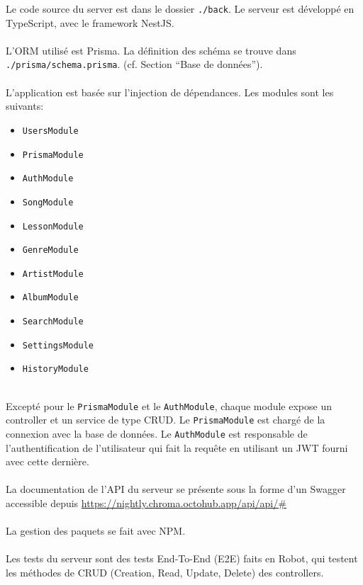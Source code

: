 Le code source du server est dans le dossier \texttt{./back}. Le serveur est développé en TypeScript, avec le framework NestJS.
\\\\
L’ORM utilisé est Prisma. La définition des schéma se trouve dans \texttt{./prisma/schema.prisma}. (cf. Section “Base de données”).
\\\\
L’application est basée sur l'injection de dépendances. Les modules sont les suivants:

\begin{itemize}
	\item \texttt{UsersModule}
	\item \texttt{PrismaModule}
	\item \texttt{AuthModule}
	\item \texttt{SongModule}
	\item \texttt{LessonModule}
	\item \texttt{GenreModule}
	\item \texttt{ArtistModule}
	\item \texttt{AlbumModule}
	\item \texttt{SearchModule}
	\item \texttt{SettingsModule}
	\item \texttt{HistoryModule}
\end{itemize}
\  \\ %
Excepté pour le \texttt{PrismaModule} et le \texttt{AuthModule}, chaque module expose un controller et un service de type CRUD.
Le \texttt{PrismaModule} est chargé de la connexion avec la base de données. Le \texttt{AuthModule} est responsable de l'authentification de l’utilisateur qui fait la requête en utilisant un JWT fourni avec cette dernière.
\\\\
La documentation de l’API du serveur se présente sous la forme d’un Swagger accessible depuis \href{https://nightly.chroma.octohub.app/api/api/#}{https://nightly.chroma.octohub.app/api/api/\#}
\\\\
La gestion des paquets se fait avec NPM.
\\\\
Les tests du serveur sont des tests End-To-End (E2E) faits en Robot, qui testent les méthodes de CRUD (Creation, Read, Update, Delete) des controllers. 
